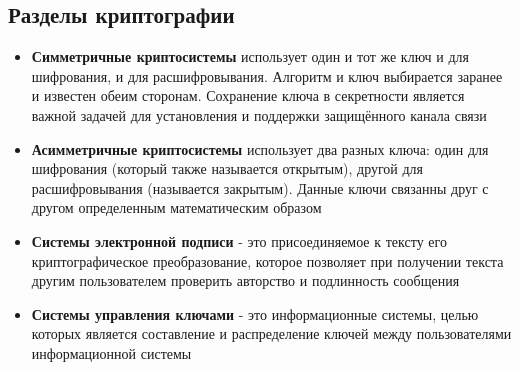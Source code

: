 \subsection{Разделы криптографии}
\begin{itemize}[noitemsep,nolistsep]
	\item \textbf{Симметричные криптосистемы} использует один и тот же ключ и для шифрования, и для расшифровывания. Алгоритм и ключ выбирается заранее и известен обеим сторонам. Сохранение ключа в секретности является важной задачей для установления и поддержки защищённого канала связи
	\item \textbf{Асимметричные криптосистемы} использует два разных ключа: один для шифрования (который также называется открытым), другой для расшифровывания (называется закрытым). Данные ключи связанны друг с другом определенным математическим образом
	\item \textbf{Системы электронной подписи} - это присоединяемое к тексту его криптографическое преобразование, которое позволяет при получении текста другим пользователем проверить авторство и подлинность сообщения
	\item \textbf{Системы управления ключами} - это информационные системы, целью которых является составление и распределение ключей между пользователями информационной системы
	
\end{itemize}